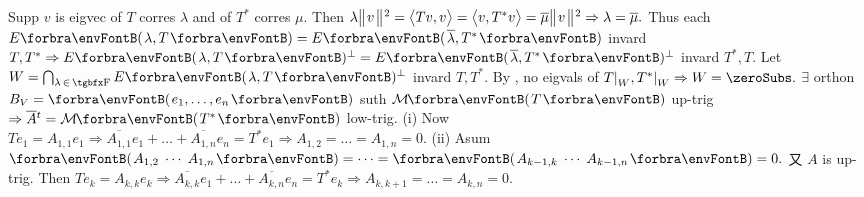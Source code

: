 \pagebreak
{}Supp $v$ is eigvec of $T$ corres $\lambda$ and of $T^*$ corres $\mu.$\parSol{}
Then $\lambda\big\Vert\hspace{1pt}{}v{}\hspace{1pt}\big\Vert{\hspace{0.5pt}}{^2}=\big\langle{}Tv,v{}\big\rangle=\big\langle{}v,T^*v{}\big\rangle=\overline{\mu}\big\Vert\hspace{1pt}{}v{}\hspace{1pt}\big\Vert{\hspace{0.5pt}}{^2}\Rightarrow\lambda=\overline{\mu}.$\parSol{}
Thus each $E\Par{\lambda,T}=E\Par{\overline{\lambda},T^*}$ invard $T,T^*\Rightarrow E\Par{\lambda,T}{^\perp}=E\Par{\overline{\lambda},T^*}{^\perp}$ invard $T^*,T.$\parSol{}
Let $W=\bigcap_{\lambda\,\in\,\Fbb}E\Par{\lambda,T}{^\perp}$ invard $T,T^*.$ By , no eigvals of $T\mmid_W,T^*\mmid_W\Rightarrow W=\zeroSubs.$\PfEnd\vspace{4pt}\parSol{}
\Or $\exists$ orthon $B_V=\Par{e_1,\dots,e_n}$ suth $\Mt{T}$ up-trig $\Rightarrow\overline{A}{^t}=\Mt{T^*}$ low-trig.\parSol{}
(i) Now $Te_1=A_{1,1}e_1\Rightarrow\overline{A_{1,1}}e_1+\dots+\overline{A_{1,n}}e_n=T^*e_1\Rightarrow A_{1,2}=\dots=A_{1,n}=0.$\parSol{}
(ii) Asum $\Par{A_{1,2}\;\cdots\;A_{1,n}}=\dots=\Par{A_{k-1,k}\;\cdots\;A_{k-1,n}}=0.$ 又 $A$ is up-trig.\vspace{1pt}\parSol{\Hii}
Then $Te_{k}=A_{k,k}e_{k}\Rightarrow\overline{A_{k,k}}e_1+\dots+\overline{A_{k,n}}e_n=T^*e_{k}\Rightarrow A_{k,k+1}=\dots=A_{k,n}=0.$\PfEnd
\SepLine


